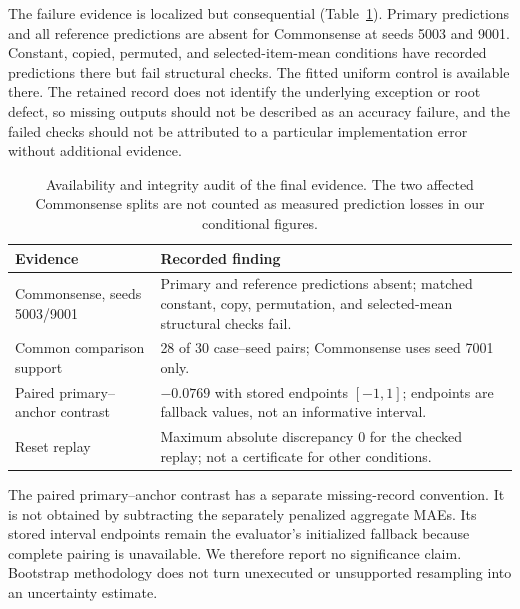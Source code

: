 \documentclass{article}
\begin{document}
The failure evidence is localized but consequential (Table~\ref{tab:audit}). Primary predictions and all reference predictions are absent for Commonsense at seeds 5003 and 9001. Constant, copied, permuted, and selected-item-mean conditions have recorded predictions there but fail structural checks. The fitted uniform control is available there. The retained record does not identify the underlying exception or root defect, so missing outputs should not be described as an accuracy failure, and the failed checks should not be attributed to a particular implementation error without additional evidence.

\begin{table}[t]
\centering
\caption{Availability and integrity audit of the final evidence. The two affected Commonsense splits are not counted as measured prediction losses in our conditional figures.}
\label{tab:audit}
\begin{tabular}{p{.30\linewidth}p{.60\linewidth}}
\toprule
Evidence & Recorded finding\\
\midrule
Commonsense, seeds 5003/9001 & Primary and reference predictions absent; matched constant, copy, permutation, and selected-mean structural checks fail.\\
Common comparison support & 28 of 30 case--seed pairs; Commonsense uses seed 7001 only.\\
Paired primary--anchor contrast & $-0.0769$ with stored endpoints $[-1,1]$; endpoints are fallback values, not an informative interval.\\
Reset replay & Maximum absolute discrepancy $0$ for the checked replay; not a certificate for other conditions.\\
\bottomrule
\end{tabular}
\end{table}

The paired primary--anchor contrast has a separate missing-record convention. It is not obtained by subtracting the separately penalized aggregate MAEs. Its stored interval endpoints remain the evaluator's initialized fallback because complete pairing is unavailable. We therefore report no significance claim. Bootstrap methodology \citep{Efron1979} does not turn unexecuted or unsupported resampling into an uncertainty estimate.
\end{document}
